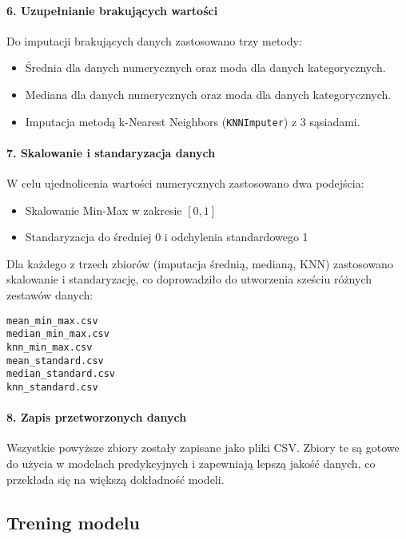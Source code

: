 \documentclass[10pt,letterpaper]{article}
\begin{document}
\paragraph{6. Uzupełnianie brakujących wartości}
Do imputacji brakujących danych zastosowano trzy metody:
\begin{itemize}
    \item Średnia dla danych numerycznych oraz moda dla danych kategorycznych.
    \item Mediana dla danych numerycznych oraz moda dla danych kategorycznych.
    \item Imputacja metodą k-Nearest Neighbors (\texttt{KNNImputer}) z 3 sąsiadami.
\end{itemize}

\paragraph{7. Skalowanie i standaryzacja danych}
W celu ujednolicenia wartości numerycznych zastosowano dwa podejścia:
\begin{itemize}
    \item Skalowanie Min-Max w zakresie $[0, 1]$
    \item Standaryzacja do średniej 0 i odchylenia standardowego 1
\end{itemize}
Dla każdego z trzech zbiorów (imputacja średnią, medianą, KNN) zastosowano skalowanie i standaryzację, co doprowadziło do utworzenia sześciu różnych zestawów danych:
\begin{verbatim}
mean_min_max.csv
median_min_max.csv
knn_min_max.csv
mean_standard.csv
median_standard.csv
knn_standard.csv
\end{verbatim}

\paragraph{8. Zapis przetworzonych danych}
Wszystkie powyższe zbiory zostały zapisane jako pliki CSV. Zbiory te są gotowe do użycia w modelach predykcyjnych i zapewniają lepszą jakość danych, co przekłada się na większą dokładność modeli.

\subsection{Trening modelu}
\end{document}
